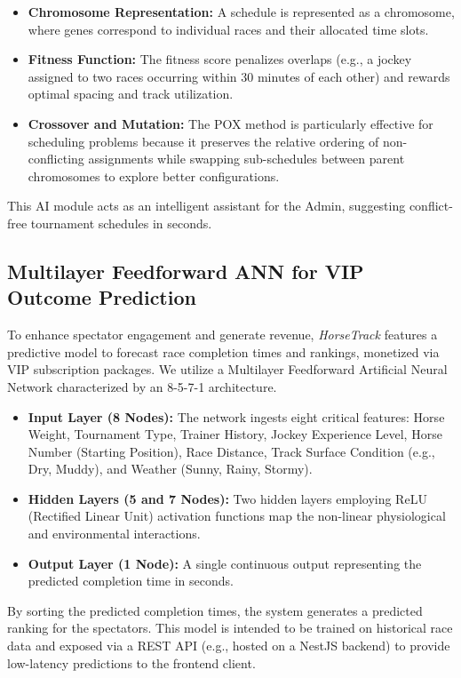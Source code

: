 \documentclass{llncs}
\begin{document}
\begin{itemize}
    \item \textbf{Chromosome Representation:} A schedule is represented as a chromosome, where genes correspond to individual races and their allocated time slots.
    \item \textbf{Fitness Function:} The fitness score penalizes overlaps (e.g., a jockey assigned to two races occurring within 30 minutes of each other) and rewards optimal spacing and track utilization.
    \item \textbf{Crossover and Mutation:} The POX method is particularly effective for scheduling problems because it preserves the relative ordering of non-conflicting assignments while swapping sub-schedules between parent chromosomes to explore better configurations.
\end{itemize}
This AI module acts as an intelligent assistant for the Admin, suggesting conflict-free tournament schedules in seconds.

\subsection{Multilayer Feedforward ANN for VIP Outcome Prediction}
To enhance spectator engagement and generate revenue, \textit{HorseTrack} features a predictive model to forecast race completion times and rankings, monetized via VIP subscription packages. We utilize a Multilayer Feedforward Artificial Neural Network characterized by an 8-5-7-1 architecture.

\begin{itemize}
    \item \textbf{Input Layer (8 Nodes):} The network ingests eight critical features: Horse Weight, Tournament Type, Trainer History, Jockey Experience Level, Horse Number (Starting Position), Race Distance, Track Surface Condition (e.g., Dry, Muddy), and Weather (Sunny, Rainy, Stormy).
    \item \textbf{Hidden Layers (5 and 7 Nodes):} Two hidden layers employing ReLU (Rectified Linear Unit) activation functions map the non-linear physiological and environmental interactions.
    \item \textbf{Output Layer (1 Node):} A single continuous output representing the predicted completion time in seconds.
\end{itemize}
By sorting the predicted completion times, the system generates a predicted ranking for the spectators. This model is intended to be trained on historical race data and exposed via a REST API (e.g., hosted on a NestJS backend) to provide low-latency predictions to the frontend client.
\end{document}
